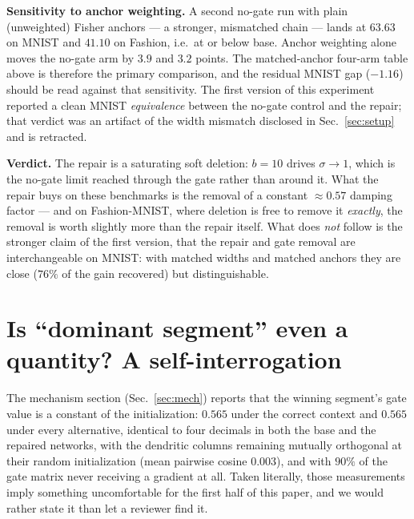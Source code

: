 \documentclass[review,12pt,number]{elsarticle}
\begin{document}
\textbf{Sensitivity to anchor weighting.} A second no-gate run with
plain (unweighted) Fisher anchors --- a stronger, mismatched chain ---
lands at $63.63$ on MNIST and $41.10$ on Fashion, i.e.\ at or below
base. Anchor weighting alone moves the no-gate arm by $3.9$ and $3.2$
points. The matched-anchor four-arm table above is therefore the
primary comparison, and the residual MNIST gap ($-1.16$) should be read
against that sensitivity. The first version of this experiment reported
a clean MNIST \emph{equivalence} between the no-gate control and the
repair; that verdict was an artifact of the width mismatch disclosed in
Sec.~\ref{sec:setup} and is retracted.

\textbf{Verdict.} The repair is a saturating soft deletion: $b{=}10$
drives $\sigma \to 1$, which is the no-gate limit reached through the
gate rather than around it. What the repair buys on these benchmarks is
the removal of a constant ${\approx}0.57$ damping factor --- and on
Fashion-MNIST, where deletion is free to remove it \emph{exactly}, the
removal is worth slightly more than the repair itself. What does
\emph{not} follow is the stronger claim of the first version, that the
repair and gate removal are interchangeable on MNIST: with matched
widths and matched anchors they are close ($76\%$ of the gain
recovered) but distinguishable.






\section{Is ``dominant segment'' even a quantity? A self-interrogation}
\label{sec:pseudo}

The mechanism section (Sec.~\ref{sec:mech}) reports that the winning
segment's gate value is a constant of the initialization: $0.565$ under the
correct context and $0.565$ under every alternative, identical to four
decimals in both the base and the repaired networks, with the dendritic
columns remaining mutually orthogonal at their random initialization
(mean pairwise cosine $0.003$), and with $90\%$ of the gate matrix never
receiving a gradient at all. Taken literally, those measurements imply
something uncomfortable for the first half of this paper, and we would
rather state it than let a reviewer find it.
\end{document}
